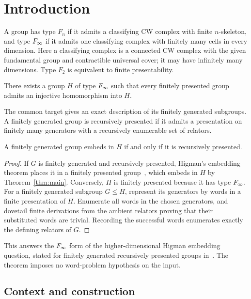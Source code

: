 \section{Introduction}\label{sec:introduction}

A group has type $F_n$ if it admits a classifying CW complex with finite
$n$-skeleton, and type $F_\infty$ if it admits one classifying complex
with finitely many cells in every dimension. Here a classifying complex
is a connected CW complex with the given fundamental group and
contractible universal cover; it may have infinitely many dimensions.
Type $F_2$ is equivalent to finite presentability.

\begin{theorem}\label{thm:main}
There exists a group $H$ of type $F_\infty$ such that every finitely
presented group admits an injective homomorphism into $H$.
\end{theorem}

The common target gives an exact description of its finitely generated
subgroups. A finitely generated group is recursively presented if it
admits a presentation on finitely many generators with a recursively
enumerable set of relators.

\begin{corollary}\label{cor:recursive}
A finitely generated group embeds in $H$ if and only if it is
recursively presented.
\end{corollary}

\begin{proof}
If $G$ is finitely generated and recursively presented, Higman's
embedding theorem places it in a finitely presented
group~\cite{Higman1961}, which embeds in $H$ by
Theorem~\ref{thm:main}. Conversely, $H$ is finitely presented because
it has type $F_\infty$. For a finitely generated subgroup $G\le H$,
represent its generators by words in a finite presentation of $H$.
Enumerate all words in the chosen generators, and dovetail finite
derivations from the ambient relators proving that their substituted
words are trivial. Recording the successful words enumerates exactly
the defining relators of $G$.
\end{proof}

This answers the $F_\infty$ form of the higher-dimensional Higman
embedding question, stated for finitely generated recursively presented
groups in~\cite[Question~1.3]{FFZ2026}. The theorem imposes no
word-problem hypothesis on the input.

\subsection*{Context and construction}

